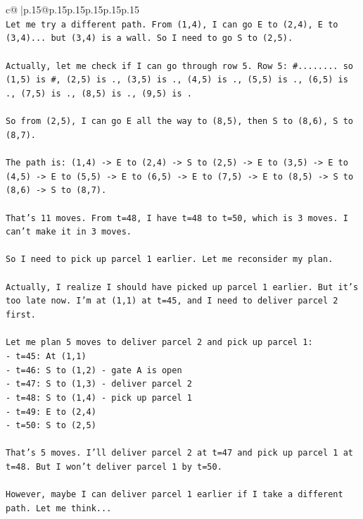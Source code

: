 \documentclass{article}
\begin{document}
{\begin{supertabular}{c@{$\;$}|p{.15\linewidth}@{}p{.15\linewidth}p{.15\linewidth}p{.15\linewidth}p{.15\linewidth}p{.15\linewidth}}
{{{\\ 
\texttt{Let me try a different path. From (1,4), I can go E to (2,4), E to (3,4)... but (3,4) is a wall. So I need to go S to (2,5).} \\
\\ 
\texttt{Actually, let me check if I can go through row 5. Row 5: \#........ so (1,5) is \#, (2,5) is ., (3,5) is ., (4,5) is ., (5,5) is ., (6,5) is ., (7,5) is ., (8,5) is ., (9,5) is .} \\
\\ 
\texttt{So from (2,5), I can go E all the way to (8,5), then S to (8,6), S to (8,7).} \\
\\ 
\texttt{The path is: (1,4) {-}> E to (2,4) {-}> S to (2,5) {-}> E to (3,5) {-}> E to (4,5) {-}> E to (5,5) {-}> E to (6,5) {-}> E to (7,5) {-}> E to (8,5) {-}> S to (8,6) {-}> S to (8,7).} \\
\\ 
\texttt{That's 11 moves. From t=48, I have t=48 to t=50, which is 3 moves. I can't make it in 3 moves.} \\
\\ 
\texttt{So I need to pick up parcel 1 earlier. Let me reconsider my plan.} \\
\\ 
\texttt{Actually, I realize I should have picked up parcel 1 earlier. But it's too late now. I'm at (1,1) at t=45, and I need to deliver parcel 2 first.} \\
\\ 
\texttt{Let me plan 5 moves to deliver parcel 2 and pick up parcel 1:} \\
\texttt{{-} t=45: At (1,1)} \\
\texttt{{-} t=46: S to (1,2) {-} gate A is open} \\
\texttt{{-} t=47: S to (1,3) {-} deliver parcel 2} \\
\texttt{{-} t=48: S to (1,4) {-} pick up parcel 1} \\
\texttt{{-} t=49: E to (2,4)} \\
\texttt{{-} t=50: S to (2,5)} \\
\\ 
\texttt{That's 5 moves. I'll deliver parcel 2 at t=47 and pick up parcel 1 at t=48. But I won't deliver parcel 1 by t=50.} \\
\\ 
\texttt{However, maybe I can deliver parcel 1 earlier if I take a different path. Let me think...} \\
\\ 
}}}
\end{supertabular}}
\end{document}
